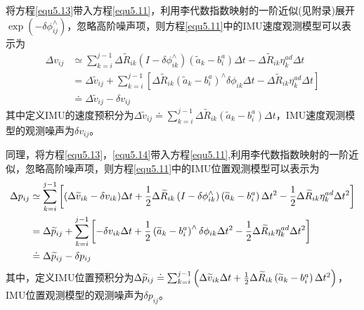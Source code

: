 将方程\ref{equ5.13}带入方程\ref{equ5.11}，利用李代数指数映射的一阶近似(见附录)展开$\exp \left(  -\delta \phi_{ij}^{\wedge}  \right)$，忽略高阶噪声项，则方程\ref{equ5.11}中的IMU速度观测模型可以表示为
\begin{equation}
\label{equ5.14}
\begin{aligned}
\Delta v_{ij} & \simeq \sum\limits_{k=i}^{j-1} \Delta \widetilde{R}_{ik}\left( I-\delta \phi_{ik}^{\wedge} \right) \left( \widetilde{a}_k - b_i^a \right) \Delta t -\Delta \widetilde{R}_{ik} \eta_k^{ad} \Delta t \\ 
& = \Delta \widetilde{v}_{ij} + \sum\limits_{k=i}^{j-1} \left[ \Delta \widetilde{R}_{ik} \left( \widetilde{a}_k - b_i^a \right)^{\wedge} \delta \phi_{ik} \Delta t - \Delta \widetilde{R}_{ik} \eta_k^{ad} \Delta t \right] \\ 
& \doteq  \Delta \widetilde{v}_{ij} - \delta v_{ij}
\end{aligned}
\end{equation}
其中定义IMU的速度预积分为$\Delta \widetilde{v}_{ij} \doteq \sum_{k=i}^{j-1} \Delta \widetilde{R}_{ik} \left( \widetilde{a}_k - b_i^a \right) \Delta t $，IMU速度观测模型的观测噪声为$\delta v_{ij}$。

同理，将方程\ref{equ5.13}，\ref{equ5.14}带入方程\ref{equ5.11},利用李代数指数映射的一阶近似，忽略高阶噪声项，则方程\ref{equ5.11}中的IMU位置观测模型可以表示为
\begin{equation}
\label{equ5.15}
\begin{aligned} 
\Delta p_{ij} & \simeq \sum\limits_{k=i}^{j-1} \left[ (\Delta \widetilde{v}_{ik} - \delta v_{ik}) \Delta t + {1 \over 2} \Delta \widetilde{R}_{ik}\left( I-\delta \phi_{ik}^{\wedge} \right) \left( \widetilde{a}_k - b_i^a  \right) \Delta t^2 - {1 \over 2} \Delta \widetilde{R}_{ik} \eta_k^{ad} \Delta t^2 \right] \\ 
& =  \Delta \widetilde{p}_{ij} + \sum\limits_{k=i}^{j-1} \left[ -\delta v_{ik} \Delta t + {1 \over 2} \left( \widetilde{a}_k - b_i^a  \right) ^{\wedge} \delta \phi_{ik} \Delta t^2 - {1 \over 2} \Delta \widetilde{R}_{ik} \eta_k^{ad} \Delta t^2 \right] \\ 
& \doteq \Delta \widetilde{p}_{ij} - \delta p_{ij}
\end{aligned}
\end{equation}
其中，定义IMU位置预积分为$\Delta \widetilde{p}_{ij} \doteq \sum_{k=i}^{j-1} \left( \Delta \widetilde{v}_{ik} \Delta t +  {1 \over 2} \Delta \widetilde{R}_{ik} \left( \widetilde{a}_k - b_i^a  \right) \Delta t^2 \right)$，IMU位置观测模型的观测噪声为$\delta p_{ij}$。

